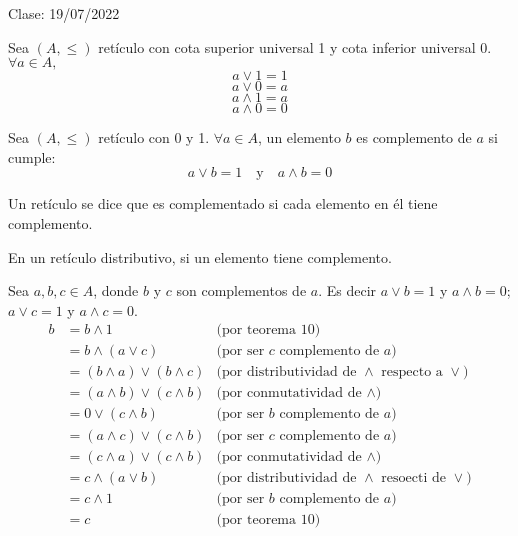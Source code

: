 Clase: 19/07/2022



\begin{teorema}
    Sea $(A,\leq)$ retículo con cota superior universal 1 y cota inferior universal 0. $\forall a\in A,$
    $$a\vee 1 =1$$
    $$a\vee 0 = a$$
    $$a\wedge 1 =a$$
    $$a\wedge 0 =0$$
\end{teorema}

\begin{definicion}[17]
    Sea $(A,\leq)$ retículo con 0 y 1. $\forall a \in A$, un elemento $b$ es complemento de $a$ si cumple: 
    $$a\vee b =1\quad \text{y}\quad  a\wedge b=0$$
\end{definicion}

\begin{definicion}[18]
    Un retículo se dice que es complementado si cada elemento en él tiene complemento. 
\end{definicion}

\begin{teorema}
    En un retículo distributivo, si un elemento tiene complemento. 
    \begin{dem}
        Sea $a,b,c\in A$, donde $b$ y $c$ son complementos de $a$. Es decir $a\vee b=1$ y $a\wedge b=0$; $a\vee c=1$ y $a\wedge c=0$.
        \begin{align*}
            b &= b\wedge 1 & \text{(por teorema 10)}\\
            &= b\wedge (a\vee c) & \text{(por ser $c$ complemento de $a$)}\\
            &= (b\wedge a)\vee (b\wedge c) & \text{(por distributividad de $\wedge$ respecto a $\vee$)}\\
            &= (a\wedge b)\vee (c\wedge b) & \text{(por conmutatividad de $\wedge$)}\\
            &= 0\vee (c\wedge b) & \text{(por ser $b$ complemento de $a$)}\\
            &= (a\wedge c)\vee (c\wedge b) & \text{(por ser $c$ complemento de $a$)}\\
            &= (c\wedge a)\vee (c\wedge b) & \text{(por conmutatividad de $\wedge$)}\\
            &= c\wedge (a\vee b) & \text{(por distributividad de $\wedge$ resoecti de $\vee$)}\\
            &= c\wedge 1 & \text{(por ser $b$ complemento de $a$)}\\
            &= c & \text{(por teorema 10)}
        \end{align*}
    \end{dem}
\end{teorema}

